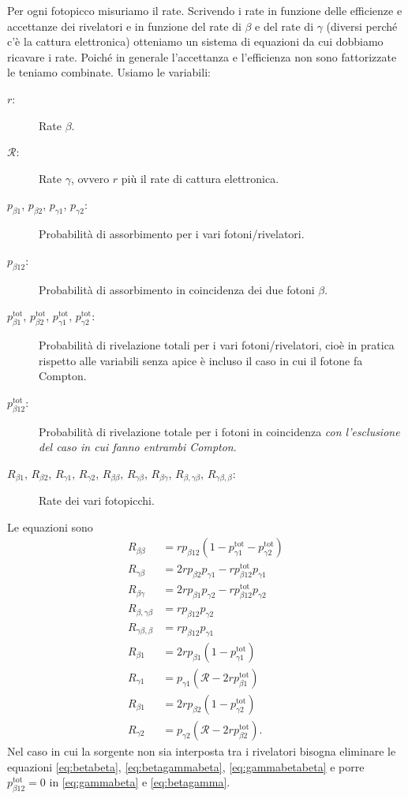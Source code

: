 Per ogni fotopicco misuriamo il rate.
Scrivendo i rate in funzione delle efficienze e accettanze dei rivelatori
e in funzione del rate di $\beta$ e del rate di $\gamma$
(diversi perché c'è la cattura elettronica)
otteniamo un sistema di equazioni da cui dobbiamo ricavare i rate.
Poiché in generale l'accettanza e l'efficienza non sono fattorizzate le teniamo combinate.
Usiamo le variabili:
\newcommand*\tot{^\text{tot}}
\newcommand*\R{r}
\newcommand*\Rtot{\mathcal{R}}
\begin{description}
	\item[$\R$:]
	Rate $\beta$.
	\item[$\Rtot$:]
	Rate $\gamma$, ovvero $r$ più il rate di cattura elettronica.
	\item[$p_{\beta1}$, $p_{\beta2}$, $p_{\gamma1}$, $p_{\gamma2}$:]
	Probabilità di assorbimento per i vari fotoni/rivelatori.
	\item[$p_{\beta12}$:]
	Probabilità di assorbimento in coincidenza dei due fotoni $\beta$.
	\item[$p_{\beta1}^\text{tot}$, $p_{\beta2}^\text{tot}$, $p_{\gamma1}^\text{tot}$, $p_{\gamma2}^\text{tot}$:]
	Probabilità di rivelazione totali per i vari fotoni/rivelatori,
	cioè in pratica rispetto alle variabili senza apice è incluso il caso in cui il fotone fa Compton.
	\item[$p_{\beta12}^\text{tot}$:]
	Probabilità di rivelazione totale per i fotoni in coincidenza
	\emph{con l'esclusione del caso in cui fanno entrambi Compton}.
	\item[$R_{\beta1}$, $R_{\beta2}$, $R_{\gamma1}$, $R_{\gamma2}$, $R_{\beta\beta}$, $R_{\gamma\beta}$, $R_{\beta\gamma}$, $R_{\beta,\gamma\beta}$, $R_{\gamma\beta,\beta}$:]
	Rate dei vari fotopicchi.
\end{description}
Le equazioni sono
\begin{align}
	R_{\beta\beta} \label{eq:betabeta}
	&= \R p_{\beta12} (1 - p_{\gamma1}\tot - p_{\gamma2}\tot) \\
	R_{\gamma\beta} \label{eq:gammabeta}
	&= 2\R p_{\beta2} p_{\gamma1} - \R p_{\beta12}\tot p_{\gamma1} \\
	R_{\beta\gamma} \label{eq:betagamma}
	&= 2\R p_{\beta1} p_{\gamma2} - \R p_{\beta12}\tot p_{\gamma2} \\
	R_{\beta,\gamma\beta} \label{eq:betagammabeta}
	&= \R p_{\beta12} p_{\gamma2} \\
	R_{\gamma\beta,\beta} \label{eq:gammabetabeta}
	&= \R p_{\beta12} p_{\gamma1} \\
	R_{\beta1}
	&= 2\R p_{\beta1} (1 - p_{\gamma1}\tot) \\
	R_{\gamma1} \label{eq:gamma1}
	&= p_{\gamma1}(\Rtot - 2 \R p_{\beta1}\tot) \\
	R_{\beta1}
	&= 2\R p_{\beta2} (1 - p_{\gamma2}\tot) \\
	R_{\gamma2} \label{eq:gamma2}
	&= p_{\gamma2} (\Rtot  - 2 \R p_{\beta2}\tot).
\end{align}
Nel caso in cui la sorgente non sia interposta tra i rivelatori
bisogna eliminare le equazioni \eqref{eq:betabeta}, \eqref{eq:betagammabeta}, \eqref{eq:gammabetabeta}
e porre $p_{\beta12}\tot = 0$ in \eqref{eq:gammabeta} e \eqref{eq:betagamma}.


